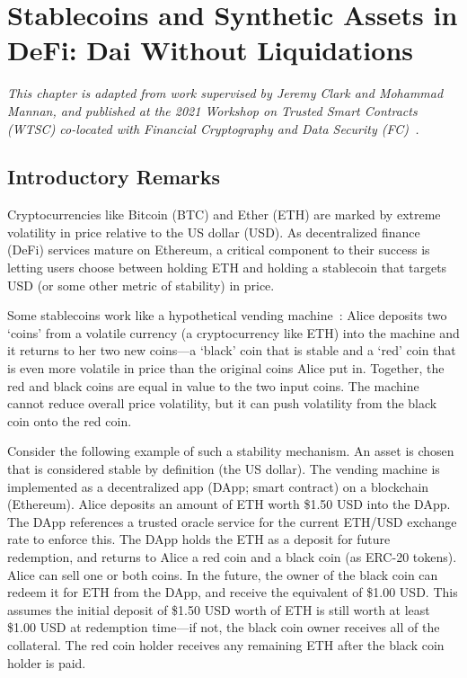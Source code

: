 \chapter{Stablecoins and Synthetic Assets in DeFi: Dai Without Liquidations} \label{ch:dai}


\textit{
This chapter is adapted from work supervised by Jeremy Clark and Mohammad Mannan, and published at the 2021 Workshop on Trusted Smart Contracts (WTSC) co-located with Financial Cryptography and Data Security (FC)~\cite{salehi2021red}.
}


\section{Introductory Remarks}

Cryptocurrencies like Bitcoin (BTC) and Ether (ETH) are marked by extreme volatility in price relative to the US dollar (USD). As decentralized finance (DeFi) services mature on Ethereum, a critical component to their success is letting users choose between holding ETH and holding a stablecoin that targets USD (or some other metric of stability) in price.

Some stablecoins work like a hypothetical vending machine~\cite{CDM20}: Alice deposits two `coins' from a volatile currency (\eg a cryptocurrency like ETH) into the machine and it returns to her two new coins---a `black' coin that is stable and a `red' coin that is even more volatile in price than the original coins Alice put in. Together, the red and black coins are equal in value to the two input coins. The machine cannot reduce overall price volatility, but it can push volatility from the black coin onto the red coin. 

Consider the following example of such a stability mechanism. An asset is chosen that is considered stable by definition (\eg the US dollar). The vending machine is implemented as a decentralized app (DApp; \aka smart contract) on a blockchain (\eg Ethereum). Alice deposits an amount of ETH worth \$1.50 USD into the DApp. The DApp references a trusted oracle service for the current ETH/USD exchange rate to enforce this. The DApp holds the ETH as a deposit for future redemption, and returns to Alice a red coin and a black coin (\eg as ERC-20 tokens). Alice can sell one or both coins. In the future, the owner of the black coin can redeem it for ETH from the DApp, and receive the equivalent of \$1.00 USD. This assumes the initial deposit of \$1.50 USD worth of ETH is still worth at least \$1.00 USD at redemption time---if not, the black coin owner receives all of the collateral. The red coin holder receives any remaining ETH after the black coin holder is paid.

